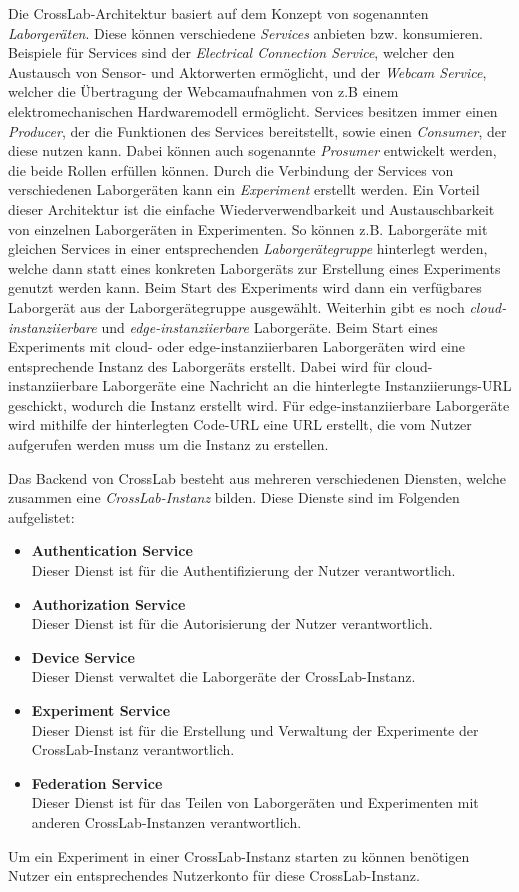 Die CrossLab-Architektur basiert auf dem Konzept von sogenannten \textit{Laborgeräten}. Diese können verschiedene \textit{Services} anbieten bzw. konsumieren. Beispiele für Services sind der \textit{Electrical Connection Service}, welcher den Austausch von Sensor- und Aktorwerten ermöglicht, und der \textit{Webcam Service}, welcher die Übertragung der Webcamaufnahmen von z.B einem elektromechanischen Hardwaremodell ermöglicht. Services besitzen immer einen \textit{Producer}, der die Funktionen des Services bereitstellt, sowie einen \textit{Consumer}, der diese nutzen kann. Dabei können auch sogenannte \textit{Prosumer} entwickelt werden, die beide Rollen erfüllen können. Durch die Verbindung der Services von verschiedenen Laborgeräten kann ein \textit{Experiment} erstellt werden. Ein Vorteil dieser Architektur ist die einfache Wiederverwendbarkeit und Austauschbarkeit von einzelnen Laborgeräten in Experimenten. So können z.B. Laborgeräte mit gleichen Services in einer entsprechenden \textit{Laborgerätegruppe} hinterlegt werden, welche dann statt eines konkreten Laborgeräts zur Erstellung eines Experiments genutzt werden kann. Beim Start des Experiments wird dann ein verfügbares Laborgerät aus der Laborgerätegruppe ausgewählt. Weiterhin gibt es noch \textit{cloud-instanziierbare} und \textit{edge-instanziierbare} Laborgeräte. Beim Start eines Experiments mit cloud- oder edge-instanziierbaren Laborgeräten wird eine entsprechende Instanz des Laborgeräts erstellt. Dabei wird für cloud-instanziierbare Laborgeräte eine Nachricht an die hinterlegte Instanziierungs-URL geschickt, wodurch die Instanz erstellt wird. Für edge-instanziierbare Laborgeräte wird mithilfe der hinterlegten Code-URL eine URL erstellt, die vom Nutzer aufgerufen werden muss um die Instanz zu erstellen.

Das Backend von CrossLab besteht aus mehreren verschiedenen Diensten, welche zusammen eine \textit{CrossLab-Instanz} bilden. Diese Dienste sind im Folgenden aufgelistet:
\begin{itemize}
    \item \textbf{Authentication Service} \\ Dieser Dienst ist für die Authentifizierung der Nutzer verantwortlich.
    \item \textbf{Authorization Service} \\ Dieser Dienst ist für die Autorisierung der Nutzer verantwortlich.
    \item \textbf{Device Service} \\ Dieser Dienst verwaltet die Laborgeräte der CrossLab-Instanz.
    \item \textbf{Experiment Service} \\ Dieser Dienst ist für die Erstellung und Verwaltung der Experimente der CrossLab-Instanz verantwortlich.
    \item \textbf{Federation Service} \\ Dieser Dienst ist für das Teilen von Laborgeräten und Experimenten mit anderen CrossLab-Instanzen verantwortlich.
\end{itemize}
Um ein Experiment in einer CrossLab-Instanz starten zu können benötigen Nutzer ein entsprechendes Nutzerkonto für diese CrossLab-Instanz.